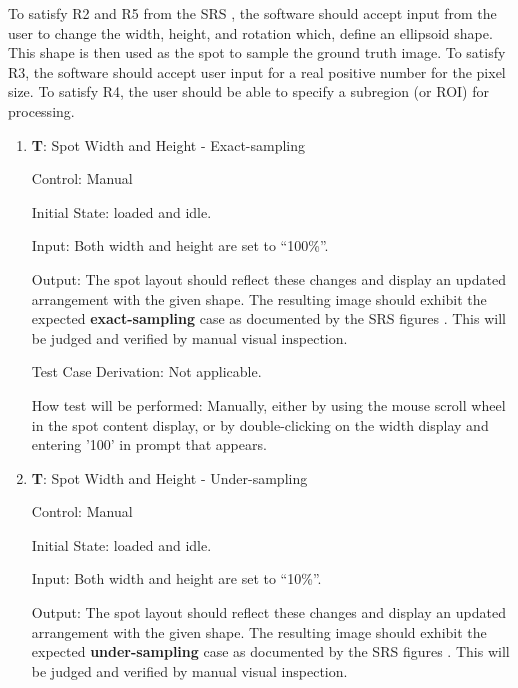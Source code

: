 \documentclass[12pt, titlepage]{article}
\newcounter{testnum} %
\begin{document}
To satisfy R2 and R5 from the SRS \citep{SRS}, the software should accept input from the user
to change the width, height, and rotation which, define an ellipsoid shape. 
This shape is then used as the spot to sample the ground truth image.
To satisfy R3, the software should accept user input for a real positive number for the pixel size.
To satisfy R4, the user should be able to specify a subregion (or ROI) for processing.

\begin{enumerate}

  \item{\textbf{T\thetestnum \label{T_spotSize}}: Spot Width and Height - Exact-sampling\\}

    Control: Manual
              
    Initial State: \progname{} loaded and idle.
              
    Input: Both width and height are set to ``100\%''.
              
    Output: The spot layout should reflect these changes and display an updated arrangement with the given shape.
      The resulting image should exhibit the expected \textbf{exact-sampling} case as documented by the SRS figures \citep{SRS}.
      This will be judged and verified by manual visual inspection.

    Test Case Derivation: Not applicable.
              
    How test will be performed: Manually, either by using the mouse scroll wheel in
      the spot content display, or by double-clicking on the width display and entering '100'
      in prompt that appears.

    \item{\textbf{T\thetestnum \label{T_spotSize10}}: Spot Width and Height - Under-sampling\\}

    Control: Manual
              
    Initial State: \progname{} loaded and idle.
              
    Input: Both width and height are set to ``10\%''.
              
    Output: The spot layout should reflect these changes and display an updated arrangement with the given shape.
      The resulting image should exhibit the expected \textbf{under-sampling} case as documented by the SRS figures \citep{SRS}.
      This will be judged and verified by manual visual inspection.


\end{enumerate}
\end{document}
